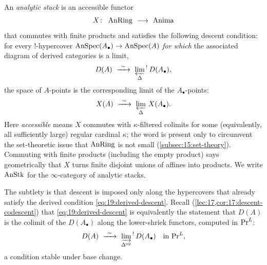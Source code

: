 \begin{definition}
\label{def:19:analytic-stack}
An \emph{analytic stack} is an accessible functor
\begin{equation*}
X\colon\ \AnRing\ \longrightarrow\ \operatorname{Anima}
\end{equation*}
that commutes with finite products and satisfies the following descent
condition: for every $!$-hypercover $\operatorname{AnSpec}(A_\bullet)\to\operatorname{AnSpec}(A)$
\emph{for which} the associated diagram of derived categories is a limit,
\begin{equation}
\label{eq:19:derived-descent}
D(A)\ \xrightarrow{\ \sim\ }\ \varprojlim_{\Delta}{}^{!}\,D(A_\bullet),
\end{equation}
the space of $A$-points is the corresponding limit of the $A_\bullet$-points:
\begin{equation}
\label{eq:19:stack-descent}
X(A)\ \xrightarrow{\ \sim\ }\ \varprojlim_{\Delta}\,X(A_\bullet).
\end{equation}
Here \emph{accessible} means $X$ commutes with $\kappa$-filtered colimits for
some (equivalently, all sufficiently large) regular cardinal $\kappa$; the word
is present only to circumvent the set-theoretic issue that $\operatorname{AnRing}$ is not
small (\cref{subsec:15:set-theory}). Commuting with finite products (including
the empty product) says geometrically that $X$ turns finite disjoint unions of
affines into products. We write $\operatorname{AnStk}$ for the $\infty$-category of analytic
stacks.\footnotemark
{}
\end{definition}

The subtlety is that descent is imposed only along the hypercovers that already
satisfy the derived condition \eqref{eq:19:derived-descent}. Recall
(\cref{lec:17,cor:17:descent-codescent}) that \eqref{eq:19:derived-descent} is
equivalently the statement that $D(A)$ is the colimit of the $D(A_\bullet)$
along the lower-shriek functors, computed in $\mathrm{Pr}^{L}$:
\begin{equation*}
D(A)\ \xrightarrow{\ \sim\ }\ \varinjlim_{\Delta^{\mathrm{op}}}{}^{!}\,D(A_\bullet)
\quad\text{in }\PrL,
\end{equation*}
a condition stable under base change.

